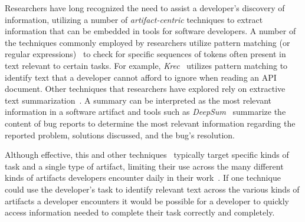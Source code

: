 Researchers have long recognized the need to assist a developer's discovery of information,
utilizing a number of
\textit{artifact-centric} techniques
to extract
information that can be embedded in
tools for software developers. 
A number of the techniques commonly employed by researchers utilize pattern matching (or regular expressions)~\cite{Maalej2013, Bavota2014, Chaparro2017}   
to check for specific sequences of tokens often present in text relevant to certain tasks. For example, \textit{Krec}~\cite{Robillard2015} utilizes pattern matching to identify text that a developer cannot afford to ignore when reading an API document.
Other techniques that researchers have explored rely on extractive text summarization~\cite{Rastkar2010, Lotufo2012, Murray2008}. 
A summary can be interpreted as the most relevant information in a software artifact 
and tools such as \textit{DeepSum}~\cite{Li2018} summarize the content of bug reports to determine 
the most relevant information regarding the reported problem, solutions discussed, and the bug's resolution. 





Although effective, this and other techniques~\red{\cite{}} typically
target specific kinds of task and a single type of artifact, limiting their use across the
many different kinds of artifacts developers encounter
daily in their work~\red{\cite{}}.
If one technique could use the developer's task
to identify relevant text across the various kinds
of artifacts a developer encounters
it would be possible for a
developer to quickly access information needed 
to complete their task correctly and completely.





